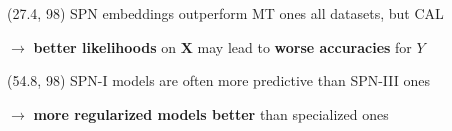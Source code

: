 \documentclass[final]{beamer}
\begin{document}
\begin{frame}{}
  \begin{textblock}{25.2}(27.4, 98)
    \small
    \textsf{SPN} embeddings outperform \textsf{MT} ones all datasets,
    but \textsf{CAL}\par
    \hspace{15pt}$\rightarrow$ \textbf{better likelihoods} on $\mathbf{X}$ may
    lead to \textbf{worse accuracies} for $Y$
  \end{textblock}
  
  \begin{textblock}{25.2}(54.8, 98)
    \small
    \textsf{SPN-I} models are often more predictive than \textsf{SPN-III} ones \par
    \hspace{15pt}$\rightarrow$ \textbf{more regularized models better} than
     specialized ones
  \end{textblock}
  

\end{frame}
\end{document}
